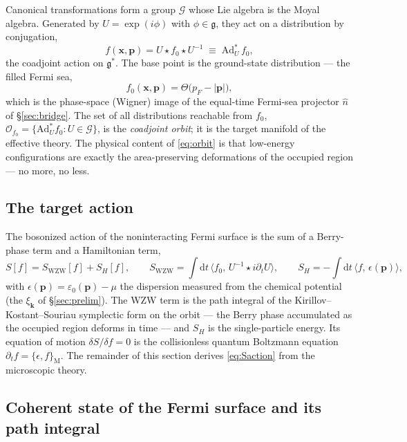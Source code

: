 \documentclass[11pt]{article}
\theoremstyle{remark}
\begin{document}
Canonical transformations form a group $\mathcal G$ whose Lie algebra is the Moyal
algebra. Generated by $U=\exp(i\phi)$ with $\phi\in\mathfrak g$, they act on a
distribution by conjugation,
\begin{equation}
\label{eq:orbit}
f(\bm{x},\bm{p}) = U \star f_0 \star U^{-1} \;\equiv\; \mathrm{Ad}^*_U\, f_0 ,
\end{equation}
the coadjoint action on $\mathfrak g^*$. The base point is the ground-state
distribution --- the filled Fermi sea,
\begin{equation}
\label{eq:f0}
f_0(\bm{x},\bm{p}) = \Theta\!\big(p_F - |\bm{p}|\big),
\end{equation}
which is the phase-space (Wigner) image of the equal-time Fermi-sea projector
$\hat n$ of \S\ref{sec:bridge}. The set of all distributions reachable from $f_0$,
$\mathcal O_{f_0}=\{\mathrm{Ad}^*_U f_0 : U\in\mathcal G\}$, is the
\emph{coadjoint orbit}; it is the target manifold of the effective theory. The
physical content of \eqref{eq:orbit} is that low-energy configurations are exactly
the area-preserving deformations of the occupied region --- no more, no less.

\subsection{The target action}

The bosonized action of the noninteracting Fermi surface is the sum of a
Berry-phase term and a Hamiltonian term,
\begin{equation}
\label{eq:Saction}
S[f] = S_{\mathrm{WZW}}[f] + S_H[f],\qquad
S_{\mathrm{WZW}} = \int\!\mathrm{d} t\,\big\langle f_0,\, U^{-1}\!\star i\partial_t U\big\rangle,
\qquad
S_H = -\int\!\mathrm{d} t\,\big\langle f,\, \epsilon(\bm{p})\big\rangle,
\end{equation}
with $\epsilon(\bm{p})=\varepsilon_0(\bm{p})-\mu$ the dispersion measured from the
chemical potential (the $\xi_{\bm{k}}$ of \S\ref{sec:prelim}). The WZW term is the
path integral of the Kirillov--Kostant--Souriau symplectic form on the orbit ---
the Berry phase accumulated as the occupied region deforms in time --- and $S_H$
is the single-particle energy. Its equation of motion $\delta S/\delta f=0$ is the
collisionless quantum Boltzmann equation $\partial_t f = \{\epsilon,f\}_{\mathrm{M}}$. The
remainder of this section derives \eqref{eq:Saction} from the microscopic theory.

\subsection{Coherent state of the Fermi surface and its path integral}
\end{document}
